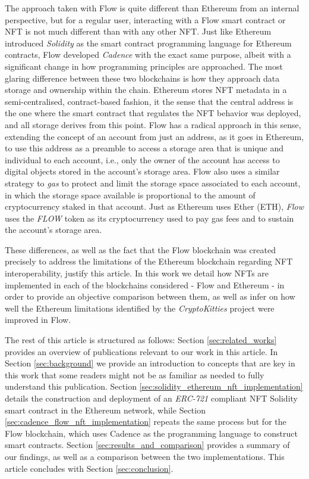 \documentclass[../main.tex]{subfiles}
\begin{document}
The approach taken with Flow is quite different than Ethereum from an internal perspective, but for a regular user, interacting with a Flow smart contract or NFT is not much different than with any other NFT. Just like Ethereum introduced \textit{Solidity} as the smart contract programming language for Ethereum contracts, Flow developed \textit{Cadence} with the exact same purpose, albeit with a significant change in how programming principles are approached. The most glaring difference between these two blockchains is how they approach data storage and ownership within the chain. Ethereum stores NFT metadata in a semi-centralised, contract-based fashion, it the sense that the central address is the one where the smart contract that regulates the NFT behavior was deployed, and all storage derives from this point. Flow has a radical approach in this sense, extending the concept of an account from just an address, as it goes in Ethereum, to use this address as a preamble to access a storage area that is unique and individual to each account, i.e., only the owner of the account has access to digital objects stored in the account's storage area. Flow also uses a similar strategy to \textit{gas} to protect and limit the storage space associated to each account, in which the storage space available is proportional to the amount of cryptocurrency staked in that account. Just as Ethereum uses Ether (ETH), \textit{Flow} uses the \textit{FLOW} token as its cryptocurrency used to pay gas fees and to sustain the account's storage area.
\par
These differences, as well as the fact that the Flow blockchain was created precisely to address the limitations of the Ethereum blockchain regarding NFT interoperability, justify this article. In this work we detail how NFTs are implemented in each of the blockchains considered - Flow and Ethereum - in order to provide an objective comparison between them, as well as infer on how well the Ethereum limitations identified by the \textit{CryptoKitties} project were improved in Flow.
\par
The rest of this article is structured as follows: Section \ref{sec:related_works} provides an overview of publications relevant to our work in this article. In Section \ref{sec:background} we provide an introduction to concepts that are key in this work that some readers might not be as familiar as needed to fully understand this publication. Section \ref{sec:solidity_ethereum_nft_implementation} details the construction and deployment of an \textit{ERC-721} compliant NFT Solidity smart contract in the Ethereum network, while Section \ref{sec:cadence_flow_nft_implementation} repeats the same process but for the Flow blockchain, which uses Cadence as the programming language to construct smart contracts. Section \ref{sec:results_and_comparison} provides a summary of our findings, as well as a comparison between the two implementations. This article concludes with Section \ref{sec:conclusion}.
\end{document}
